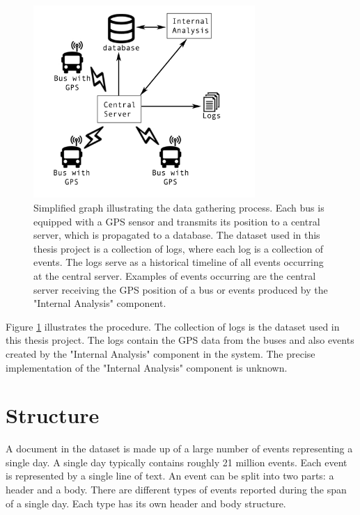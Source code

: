 \begin{figure}
    \centering
    \includegraphics[width=0.75\textwidth]{figures/data-gathering}
    \caption{Simplified graph illustrating the data gathering process. 
    Each bus is equipped with a GPS sensor and transmits its position to a central server, which is propagated to a database.
    The dataset used in this thesis project is a collection of logs, where each log is a collection of events.
    The logs serve as a historical timeline of all events occurring at the central server.
    Examples of events occurring are the central server receiving the GPS position of a bus or events produced by the "Internal Analysis" component.}
    \label{fig:data-gathering}
\end{figure}

Figure \ref{fig:data-gathering} illustrates the procedure.
The collection of logs is the dataset used in this thesis project.
The logs contain the GPS data from the buses and also events created by the "Internal Analysis" component in the system.
The precise implementation of the "Internal Analysis" component is unknown.

\section{Structure} \label{sec:data-structure}
A document in the dataset is made up of a large number of events representing a single day.
A single day typically contains roughly 21  million events.  
Each event is represented by a single line of text.
An event can be split into two parts: a header and a body.
There are different types of events reported during the span of a single day.
Each type has its own header and body structure.

